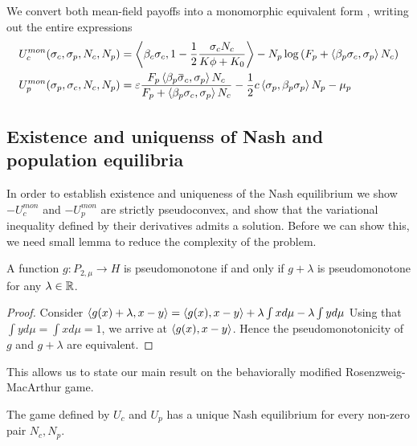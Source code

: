 We convert both mean-field payoffs into a monomorphic equivalent form , writing out the entire expressions
\begin{align}
  \label{eq:mon_eq_forms}
  U_c^{mon}(\sigma_c, \sigma_p, N_c, N_p) &= \ip{\beta_c \sigma_c}{1-\frac{1}{2}\frac{\sigma_c N_c}{K\phi + K_0}} - N_p\log\pa{F_p + \ip{\beta_p \sigma_c}{\sigma_p} N_c} \\
  U_p^{mon}(\sigma_p, \sigma_c, N_c, N_p) &= \epsilon \frac{F_p \ip{\beta_p \overbar{\sigma}_c}{\sigma_p} N_c}{F_p + \ip{\beta_p \sigma_c}{\sigma_p} N_c} - \frac{1}{2}c \ip{\sigma_p}{\beta_p \sigma_p}N_p  - \mu_p
\end{align}
\subsection{Existence and uniquenss of Nash and population equilibria}
In order to establish existence and uniqueness of the Nash equilibrium we show $-U_c^{mon}$ and $-U_p^{mon}$ are strictly pseudoconvex, and show that the variational inequality defined by their derivatives admits a solution. Before we can show this, we need small lemma to reduce the complexity of the problem.
\begin{lemma}
  \label{lem:pseudo_reduc}
  A function $g: P_{2,\mu} \to H$ is pseudomonotone if and only if $g+\lambda$ is pseudomonotone for any $\lambda \in \mathbb{R}$.
\end{lemma}
\begin{proof}
  Consider $\left \langle g(x)+\lambda,x-y \right \rangle=\left \langle g(x),x-y \right \rangle+\lambda \int x d\mu - \lambda \int y d\mu$
  Using that $\int y d\mu = \int x d\mu = 1$, we arrive at  $\left \langle g(x),x-y \right \rangle$.
  Hence the pseudomonotonicity of $g$ and $g+\lambda$ are equivalent.
\end{proof}
This allows us to state our main result on the behaviorally modified Rosenzweig-MacArthur game.
\begin{proposition}
  \label{prop:exist_unique_nash}
  The game defined by $U_c$ and $U_p$ has a unique Nash equilibrium for every non-zero pair $N_c,N_p$.
\end{proposition}
